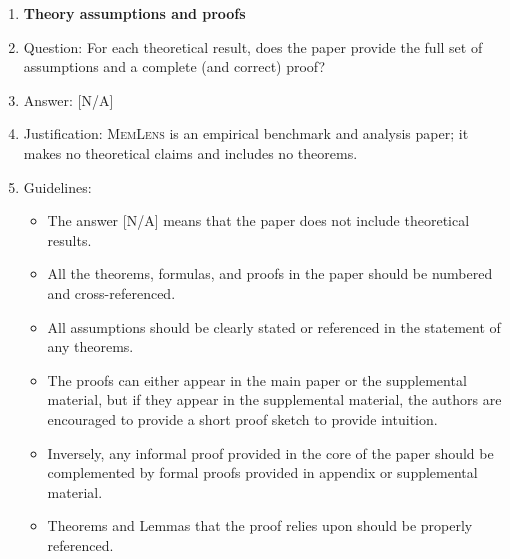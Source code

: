 \documentclass{llmxive}
\providecommand{\bench}{\textsc{MemLens}}
\providecommand{\answerNA}[1][]{[N/A]#1}
\begin{document}
\begin{enumerate}
\item {\bf Theory assumptions and proofs}
    \item[] Question: For each theoretical result, does the paper provide the full set of assumptions and a complete (and correct) proof?
    \item[] Answer: \answerNA{}
    \item[] Justification: \bench{} is an empirical benchmark and analysis paper; it makes no theoretical claims and includes no theorems.
    \item[] Guidelines:
    \begin{itemize}
        \item The answer \answerNA{} means that the paper does not include theoretical results.
        \item All the theorems, formulas, and proofs in the paper should be numbered and cross-referenced.
        \item All assumptions should be clearly stated or referenced in the statement of any theorems.
        \item The proofs can either appear in the main paper or the supplemental material, but if they appear in the supplemental material, the authors are encouraged to provide a short proof sketch to provide intuition.
        \item Inversely, any informal proof provided in the core of the paper should be complemented by formal proofs provided in appendix or supplemental material.
        \item Theorems and Lemmas that the proof relies upon should be properly referenced.
    \end{itemize}


\end{enumerate}
\end{document}
